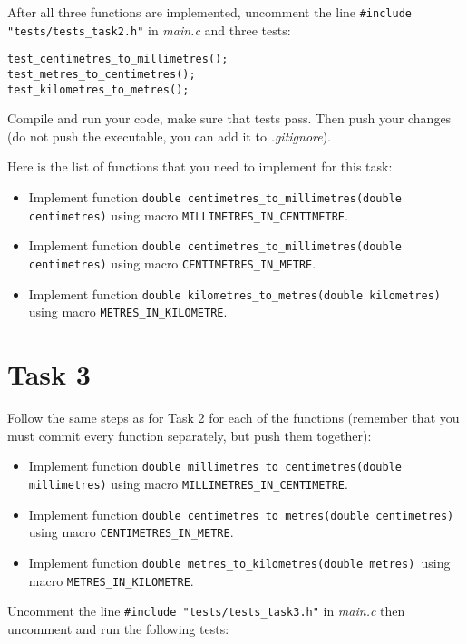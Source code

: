 \documentclass[a4paper,11pt]{article}
\begin{document}
After all three functions are implemented, uncomment the line \lstinline{#include "tests/tests_task2.h"} in \emph{main.c} and three tests:

\begin{lstlisting}
test_centimetres_to_millimetres();
test_metres_to_centimetres();
test_kilometres_to_metres();
\end{lstlisting}

Compile and run your code, make sure that tests pass. Then push your changes (do not push the executable, you can add it to \emph{.gitignore}).

Here is the list of functions that you need to implement for this task:

\begin{itemize}
\item Implement function \lstinline{double centimetres_to_millimetres(double centimetres)} using macro \lstinline{MILLIMETRES_IN_CENTIMETRE}.
\item Implement function \lstinline{double centimetres_to_millimetres(double centimetres)} using macro \lstinline{CENTIMETRES_IN_METRE}.
\item Implement function \lstinline{double kilometres_to_metres(double kilometres)} using macro \lstinline{METRES_IN_KILOMETRE}.
\end{itemize}

\section*{Task 3}

Follow the same steps as for Task 2 for each of the functions (remember that you must commit every function separately, but push them together):

\begin{itemize}
\item Implement function \lstinline{double millimetres_to_centimetres(double millimetres)} using macro \lstinline{MILLIMETRES_IN_CENTIMETRE}.
\item Implement function \lstinline{double centimetres_to_metres(double centimetres)} using macro \lstinline{CENTIMETRES_IN_METRE}.
\item Implement function \lstinline{double metres_to_kilometres(double metres) }using macro \lstinline{METRES_IN_KILOMETRE}.
\end{itemize}

Uncomment the line \lstinline{#include "tests/tests_task3.h"} in \emph{main.c} then uncomment and run the following tests:
\end{document}
